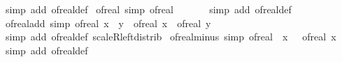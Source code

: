 \begin{isabellebody}
\isamarkupfalse%
\ {\isacharparenleft}{\kern0pt}simp\ add{\isacharcolon}{\kern0pt}\ of{\isacharunderscore}{\kern0pt}real{\isacharunderscore}{\kern0pt}def{\isacharparenright}{\kern0pt}%
\endisatagproof
{\isafoldproof}%
%
\isadelimproof
\isanewline
%
\endisadelimproof
\isanewline
{}\isamarkupfalse%
\ of{\isacharunderscore}{\kern0pt}real{\isacharunderscore}{\kern0pt}{}\ {\isacharbrackleft}{\kern0pt}simp{\isacharbrackright}{\kern0pt}{\isacharcolon}{\kern0pt}\ {\isachardoublequoteopen}of{\isacharunderscore}{\kern0pt}real\ {}\ {\isacharequal}{\kern0pt}\ {}{\isachardoublequoteclose}\isanewline
%
\isadelimproof
\ \ %
\endisadelimproof
%
\isatagproof
{}\isamarkupfalse%
\ {\isacharparenleft}{\kern0pt}simp\ add{\isacharcolon}{\kern0pt}\ of{\isacharunderscore}{\kern0pt}real{\isacharunderscore}{\kern0pt}def{\isacharparenright}{\kern0pt}%
\endisatagproof
{\isafoldproof}%
%
\isadelimproof
\isanewline
%
\endisadelimproof
\isanewline
{}\isamarkupfalse%
\ of{\isacharunderscore}{\kern0pt}real{\isacharunderscore}{\kern0pt}add\ {\isacharbrackleft}{\kern0pt}simp{\isacharbrackright}{\kern0pt}{\isacharcolon}{\kern0pt}\ {\isachardoublequoteopen}of{\isacharunderscore}{\kern0pt}real\ {\isacharparenleft}{\kern0pt}x\ {\isacharplus}{\kern0pt}\ y{\isacharparenright}{\kern0pt}\ {\isacharequal}{\kern0pt}\ of{\isacharunderscore}{\kern0pt}real\ x\ {\isacharplus}{\kern0pt}\ of{\isacharunderscore}{\kern0pt}real\ y{\isachardoublequoteclose}\isanewline
%
\isadelimproof
\ \ %
\endisadelimproof
%
\isatagproof
{}\isamarkupfalse%
\ {\isacharparenleft}{\kern0pt}simp\ add{\isacharcolon}{\kern0pt}\ of{\isacharunderscore}{\kern0pt}real{\isacharunderscore}{\kern0pt}def\ scaleR{\isacharunderscore}{\kern0pt}left{\isacharunderscore}{\kern0pt}distrib{\isacharparenright}{\kern0pt}%
\endisatagproof
{\isafoldproof}%
%
\isadelimproof
\isanewline
%
\endisadelimproof
\isanewline
{}\isamarkupfalse%
\ of{\isacharunderscore}{\kern0pt}real{\isacharunderscore}{\kern0pt}minus\ {\isacharbrackleft}{\kern0pt}simp{\isacharbrackright}{\kern0pt}{\isacharcolon}{\kern0pt}\ {\isachardoublequoteopen}of{\isacharunderscore}{\kern0pt}real\ {\isacharparenleft}{\kern0pt}{\isacharminus}{\kern0pt}\ x{\isacharparenright}{\kern0pt}\ {\isacharequal}{\kern0pt}\ {\isacharminus}{\kern0pt}\ of{\isacharunderscore}{\kern0pt}real\ x{\isachardoublequoteclose}\isanewline
%
\isadelimproof
\ \ %
\endisadelimproof
%
\isatagproof
{}\isamarkupfalse%
\ {\isacharparenleft}{\kern0pt}simp\ add{\isacharcolon}{\kern0pt}\ of{\isacharunderscore}{\kern0pt}real{\isacharunderscore}{\kern0pt}def{\isacharparenright}{\kern0pt}%

\end{isabellebody}
